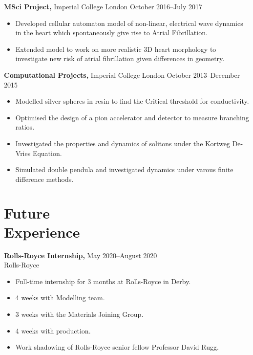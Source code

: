 \documentclass[margin]{res}
\begin{document}
\begin{resume}
 {\bf MSci Project,} Imperial College London \hfill October 2016--July 2017
 \begin{itemize} \itemsep -2pt  %
   \item Developed cellular automaton model of non-linear, electrical wave dynamics in the heart which spontaneously give rise to Atrial Fibrillation.
   \item Extended model to work on more realistic 3D heart morphology to investigate new risk of atrial fibrillation given differences in geometry. 
 \end{itemize}



 {\bf Computational Projects,} Imperial College London \hfill October 2013--December 2015
 \begin{itemize} \itemsep -2pt  %
\item Modelled silver spheres in resin to find the Critical threshold for conductivity.
\item Optimised the design of a pion accelerator and detector to measure branching ratios.
 \item Investigated the properties and dynamics of solitons under the Kortweg De-Vries Equation.
\item Simulated double pendula and investigated dynamics under varous finite difference methods.

 \end{itemize}

\section{Future\\ Experience}

 {\bf Rolls-Royce Internship,} \hfill May 2020--August 2020\\ Rolls-Royce
  \begin{itemize} \itemsep -2pt  %
    \item Full-time internship for 3 months at Rolls-Royce in Derby. 
    \item 4 weeks with Modelling team.
    \item 3 weeks with the Materials Joining Group.
    \item 4 weeks with production.
    \item Work shadowing of Rolls-Royce senior fellow Professor David Rugg.
  \end{itemize}


\end{resume}
\end{document}
